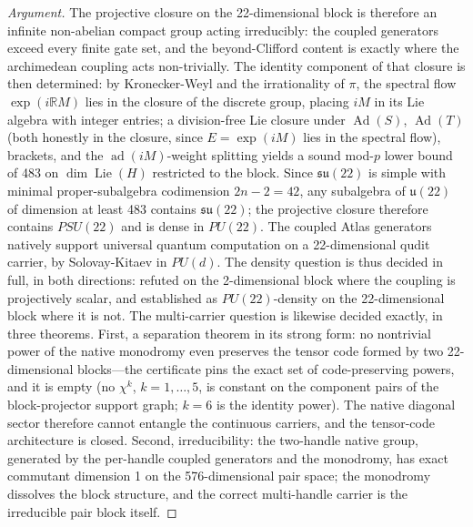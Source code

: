 \begin{proof}[Argument]
The projective closure on the 22-dimensional block is therefore an infinite non-abelian compact group acting irreducibly: the coupled generators exceed every finite gate set, and the beyond-Clifford content is exactly where the archimedean coupling acts non-trivially.
The identity component of that closure is then determined: by Kronecker-Weyl and the irrationality of $\pi$, the spectral flow $\exp(i\mathbb{R}M)$ lies in the closure of the discrete group, placing $iM$ in its Lie algebra with integer entries; a division-free Lie closure under $\operatorname{Ad}(S)$, $\operatorname{Ad}(T)$ (both honestly in the closure, since $E = \exp(iM)$ lies in the spectral flow), brackets, and the $\operatorname{ad}(iM)$-weight splitting yields a sound mod-$p$ lower bound of 483 on $\dim \operatorname{Lie}(H)$ restricted to the block.
Since $\mathfrak{su}(22)$ is simple with minimal proper-subalgebra codimension $2n-2 = 42$, any subalgebra of $\mathfrak{u}(22)$ of dimension at least 483 contains $\mathfrak{su}(22)$; the projective closure therefore contains $PSU(22)$ and is dense in $PU(22)$.
The coupled Atlas generators natively support universal quantum computation on a 22-dimensional qudit carrier, by Solovay-Kitaev in $PU(d)$.
The density question is thus decided in full, in both directions: refuted on the 2-dimensional block where the coupling is projectively scalar, and established as $PU(22)$-density on the 22-dimensional block where it is not.
The multi-carrier question is likewise decided exactly, in three theorems.
First, a separation theorem in its strong form: no nontrivial power of the native monodromy even preserves the tensor code formed by two 22-dimensional blocks---the certificate pins the exact set of code-preserving powers, and it is empty (no $\chi^{k}$, $k = 1,\dots,5$, is constant on the component pairs of the block-projector support graph; $k=6$ is the identity power). The native diagonal sector therefore cannot entangle the continuous carriers, and the tensor-code architecture is closed.
Second, irreducibility: the two-handle native group, generated by the per-handle coupled generators and the monodromy, has exact commutant dimension 1 on the 576-dimensional pair space; the monodromy dissolves the block structure, and the correct multi-handle carrier is the irreducible pair block itself.

\end{proof}
